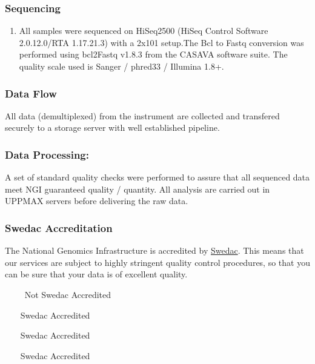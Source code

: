 \documentclass[12pt]{article}
\newcommand{\tickmark}{\ding{51}}%
\newcommand{\crossmark}{\ding{55}}%
\begin{document}
\subsubsection{Sequencing}\label{sequencing}

\begin{enumerate}
\def\labelenumi{\Alph{enumi})}
\itemsep1pt\parskip0pt
\item
  All samples were sequenced on HiSeq2500 (HiSeq Control Software
  2.0.12.0/RTA 1.17.21.3) with a 2x101 setup.The Bcl to Fastq conversion
  was performed using bcl2Fastq v1.8.3 from the CASAVA software suite.
  The quality scale used is Sanger / phred33 / Illumina 1.8+.
\end{enumerate}

\subsubsection{Data Flow}\label{data-flow}

All data (demultiplexed) from the instrument are collected and
transfered securely to a storage server with well established pipeline.

\subsubsection{Data Processing:}\label{data-processing}

A set of standard quality checks were performed to assure that all
sequenced data meet NGI guaranteed quality / quantity. All analysis are
carried out in UPPMAX servers before delivering the raw data.

\subsubsection{Swedac Accreditation}\label{swedac-accreditation}

The National Genomics Infrastructure is accredited by
\href{http://www.swedac.se}{Swedac}. This means that our services are
subject to highly stringent quality control procedures, so that you can
be sure that your data is of excellent quality.

\begin{description}
\itemsep1pt\parskip0pt
\item[Library preparation]
~\crossmark~~~ Not Swedac Accredited
\item[Sequencing data]
~\tickmark~~ Swedac Accredited
\item[Data flow]
~\tickmark~~ Swedac Accredited
\item[Data processing]
~\tickmark~~ Swedac Accredited
\end{description}
\end{document}
